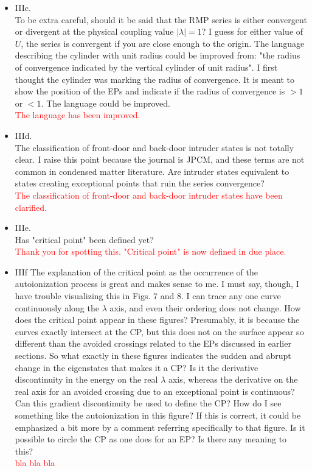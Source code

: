 \documentclass[10pt]{letter}
\newcommand{\alert}[1]{\textcolor{red}{#1}}
\begin{document}
\begin{letter}
\begin{itemize}
\item 
	{IIIc.\\
	To be extra careful, should it be said that the RMP series is either convergent or divergent at the physical coupling value $|\lambda|=1$? 
	I guess for either value of $U$, the series is convergent if you are close enough to the origin.
	The language describing the cylinder with unit radius could be improved from: "the radius of convergence indicated by the vertical cylinder of unit radius".
	I first thought the cylinder was marking the radius of convergence. It is meant to show the position of the EPs and indicate if the radius of convergence is $>1$ or $<1$. 
	The language could be improved.}
	\\
	\alert{The language has been improved.}

\item 
	{IIId.\\
	The classification of front-door and back-door intruder states is not totally clear. 
	I raise this point because the journal is JPCM, and these terms are not common in condensed matter literature. 
	Are intruder states equivalent to states creating exceptional points that ruin the series convergence?}
	\\
	\alert{The classification of front-door and back-door intruder states have been clarified.}

\item 
	{IIIe.\\
	Has "critical point" been defined yet?}
	\\
	\alert{Thank you for spotting this. 
	"Critical point" is now defined in due place.}

\item 
	{IIIf
	The explanation of the critical point as the occurrence of the autoionization process is great and makes sense to me. 
	I must say, though, I have trouble visualizing this in Figs. 7 and 8. 
	I can trace any one curve continuously along the $\lambda$ axis, and even their ordering does not change. 
	How does the critical point appear in these figures? 
	Presumably, it is because the curves exactly intersect at the CP, but this does not on the surface appear so different than the avoided crossings related to the EPs discussed in earlier sections.
	So what exactly in these figures indicates the sudden and abrupt change in the eigenstates that makes it a CP? 
	Is it the derivative discontinuity in the energy on the real $\lambda$ axis, whereas the derivative on the real axis for an avoided crossing due to an exceptional point is continuous? 
	Can this gradient discontinuity be used to define the CP? 
	How do I see something like the autoionization in this figure? 
	If this is correct, it could be emphasized a bit more by a comment referring specifically to that figure.
	Is it possible to circle the CP as one does for an EP? 
	Is there any meaning to this?}
	\\
	\alert{bla bla bla}


\end{itemize}
\end{letter}
\end{document}

